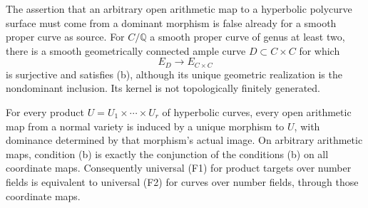 \begin{proposition}
\label{F-surface-products}
The assertion that an arbitrary open arithmetic map to a
hyperbolic polycurve surface must come from a dominant morphism
is false already for a smooth proper curve as source. For
$C/\mathbb Q$ a smooth proper curve of genus at least two,
there is a smooth geometrically connected ample curve
$D\subset C\times C$ for which
\[
 E_D\longrightarrow E_{C\times C}
\]
is surjective and satisfies (b), although its unique geometric
realization is the nondominant inclusion. Its kernel is not
topologically finitely generated.

For every product $U=U_1\times\cdots\times U_r$ of hyperbolic
curves, every open arithmetic map from a normal variety is
induced by a unique morphism to $U$, with dominance determined
by that morphism's actual image. On arbitrary arithmetic maps,
condition (b) is exactly the conjunction of the conditions (b)
on all coordinate maps. Consequently universal (F1) for product
targets over number fields is equivalent to universal (F2) for
curves over number fields, through those coordinate maps.
\end{proposition}
